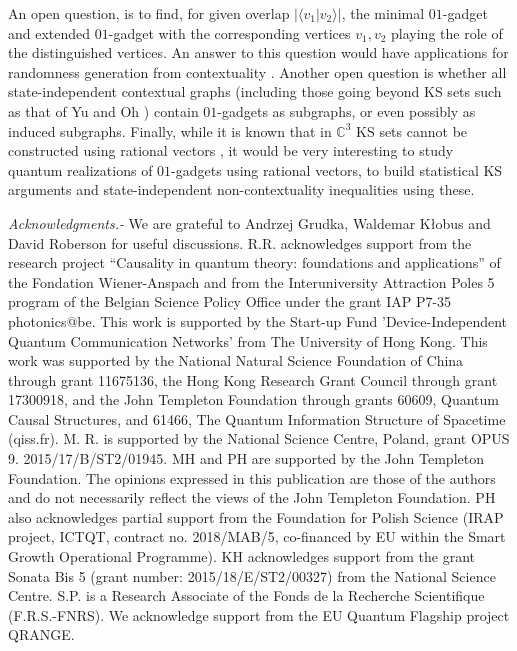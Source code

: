 \documentclass[twocolumn, a4paper, superscriptaddress,nofootinbib, accepted=2020-08-07, hyperref]{quantumarticle}
\begin{document}
An open question, is to find, for given overlap  $| \langle v_1 | v_2 \rangle|$, the minimal $01$-gadget and extended $01$-gadget with the corresponding vertices $v_1,v_2$ playing the role of the distinguished vertices. An answer to this question would have applications for randomness generation from contextuality \cite{R17}. 
Another open question is whether all state-independent contextual graphs (including those going beyond KS sets such as that of Yu and Oh \cite{YO12}) contain $01$-gadgets as subgraphs, or even possibly as induced subgraphs. Finally, while it is known that in $\mathbb{C}^3$ KS sets cannot be constructed using rational vectors \cite{GN08}, it would be very interesting to study quantum realizations of $01$-gadgets using rational vectors, to build statistical KS arguments and state-independent non-contextuality inequalities using these.  


\textit{Acknowledgments.-}
We are grateful to Andrzej Grudka, Waldemar K\l obus and David Roberson for useful discussions.
R.R. acknowledges support from the research project  ``Causality in quantum theory: foundations and applications'' of the Fondation Wiener-Anspach and from the Interuniversity Attraction Poles 5 program of the Belgian Science Policy Office under the grant IAP P7-35 photonics@be. This work is supported by the Start-up Fund 'Device-Independent Quantum Communication Networks' from The University of Hong Kong. This work was supported by the National Natural Science Foundation of China through grant 11675136, the Hong Kong Research Grant Council through grant 17300918, and the John Templeton Foundation through grants 60609, Quantum Causal Structures, and 61466, The Quantum Information Structure of Spacetime (qiss.fr). M. R. is supported by the National Science Centre, Poland, grant OPUS 9. 2015/17/B/ST2/01945. MH and PH are supported by the John Templeton Foundation. The opinions expressed in this publication are those of the authors and do not necessarily reflect the views of the John Templeton Foundation. PH also acknowledges partial support from the Foundation for Polish Science (IRAP project, ICTQT, contract no. 2018/MAB/5, co-financed by EU within the Smart Growth Operational Programme). KH acknowledges support from the grant Sonata Bis 5 (grant number: 2015/18/E/ST2/00327) from the National Science Centre. S.P. is a Research Associate of the Fonds de la Recherche Scientifique (F.R.S.-FNRS). We acknowledge support from the EU Quantum Flagship project QRANGE.
\end{document}
